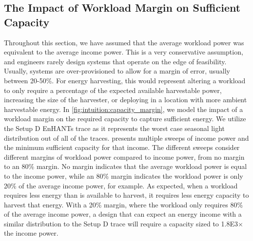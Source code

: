\subsection{The Impact of Workload Margin on Sufficient Capacity}
\label{sec:intuition:margin}
Throughout this section, we have assumed that the average workload power was equivalent to the average income power. This is a very conservative assumption, and engineers rarely design systems that operate on the edge of feasibility. 
Usually, systems are over-provisioned to allow for a margin of error, usually between 20-50\%. 
For energy harvesting, this would represent altering a workload to only require a percentage of the expected available harvestable power, increasing the size of the harvester, or deploying in a location with more ambient harvestable energy.
In \cref{fig:intuition:capacity_margin}, we model the impact of a workload margin on the required capacity to capture sufficient energy. 
We utilize the Setup D EnHANTs trace as it represents the worst case seasonal light distribution out of all of the traces. 
 presents multiple sweeps of income power and the minimum sufficient capacity for that income. 
The different sweeps consider different margins of workload power compared to income power, from no margin to an 80\% margin. 
No margin indicates that the average workload power is equal to the income power, while an 80\% margin indicates the workload power is only 20\% of the average income power, for example. 
As expected, when a workload requires less energy than is available to harvest, it requires less energy capacity to harvest that energy.
With a 20\% margin, where the workload only requires 80\% of the average income power, a design that can expect an energy income with a similar distribution to the Setup D trace will require a capacity sized to \num{1.8E3}$\times$ the income power. 


